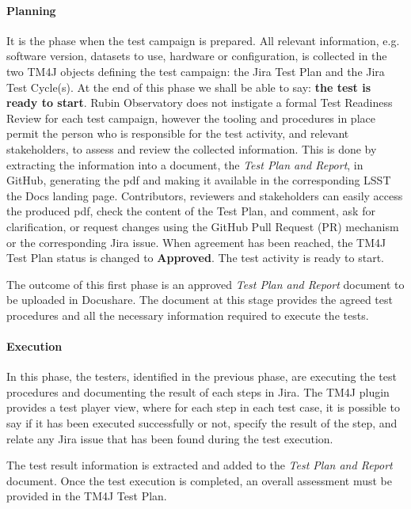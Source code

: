 \paragraph{Planning}
It is the phase when the test campaign is prepared. All relevant information, e.g. software version, datasets to use, 
hardware or configuration, is  collected in the two TM4J objects defining the test campaign:  the Jira Test Plan and the Jira Test Cycle(s).
At the end of this phase we shall be able to say: \textbf{the test is ready to start}.
Rubin Observatory does not instigate a formal Test Readiness Review for each test campaign,
however the tooling and procedures in place permit the person who is responsible for the test activity, and relevant stakeholders, to assess and review the collected information.
This is done by extracting the information into a document, the \textit{Test Plan and Report}, in GitHub, generating the pdf and making it available
in the corresponding LSST the Docs landing page. Contributors, reviewers and stakeholders can easily access the produced pdf,
check the content of the Test Plan, and comment, ask for clarification, or request changes using the GitHub
Pull Request (PR) mechanism or the corresponding Jira issue.
When agreement has been reached, the TM4J Test Plan status is changed to \textbf{Approved}. The test activity is ready to start.

The outcome of this first phase is an approved \textit{Test Plan and Report} document to be uploaded in Docushare.
The document at this stage provides the agreed test procedures and all the necessary information required to execute the tests.

\paragraph{Execution}
In this phase, the testers, identified in the previous phase, are  executing the test procedures and
documenting the result of each steps in Jira.
The TM4J plugin provides a test player view, where for each step in each test case, it is possible to say if it has been executed successfully or not,
specify the result of the step, and relate any Jira issue that has been found during the test execution.

The test result information is extracted and added to the \textit{Test Plan and Report} document.
Once the test execution is completed, an overall assessment must  be provided in the TM4J Test Plan.

